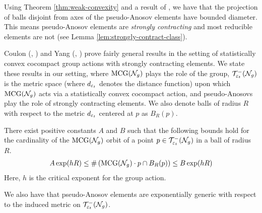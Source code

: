 
Using Theorem \ref{thm:weak-convexity} and a result of \textcite{minsky1996quasi}, we have that the projection of balls disjoint from axes of the pseudo-Anosov elements have bounded diameter.
This means pseudo-Anosov elements are \emph{strongly contracting} and most reducible elements are not (see Lemma \ref{lem:strongly-contract-class}).

Coulon (\cite{coulon2022patterson}, \cite{coulon2024ergodicity}) and Yang (\cite{10.1093/imrn/rny001}, \cite{yang2020genericity}) prove fairly general results in the setting of statistically convex cocompact group actions with strongly contracting elements.
We state these results in our setting, where $\mathrm{MCG}(\mathcal{N}_g)$ plays the role of the group, $\mathcal{T}_{\varepsilon_t}^{-}(\mathcal{N}_g)$ is the metric space (where $d_{\varepsilon_t}$ denotes the distance function) upon which $\mathrm{MCG}(\mathcal{N}_g)$ acts via a statistically convex cocompact action, and pseudo-Anosovs play the role of strongly contracting elements.
We also denote balls of radius $R$ with respect to the metric $d_{\varepsilon_t}$ centered at $p$ as $B_R(p)$.

\begin{theorem}
  There exist positive constants $A$ and $B$ such that the following bounds hold for the cardinality of the $\mathrm{MCG}(\mathcal{N}_g)$ orbit of a point $p \in \mathcal{T}_{\varepsilon_t}^{-}(\mathcal{N}_g)$ in a ball of radius $R$.
  \begin{align*}
    A \exp(hR) \leq \#\left( \mathrm{MCG}(\mathcal{N}_g) \cdot p \cap B_R(p) \right) \leq B \exp(hR)
  \end{align*}
  Here, $h$ is the critical exponent for the group action.
\end{theorem}

We also have that pseudo-Anosov elements are exponentially generic with respect to the induced metric on $\mathcal{T}_{\varepsilon_t}^{-}(\mathcal{N}_g)$.


